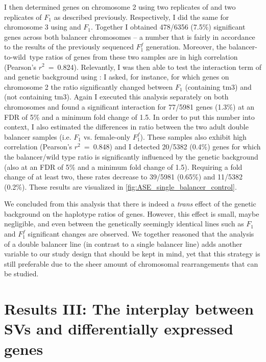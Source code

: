 I then determined \ase genes on chromosome 2 using two replicates of \Fcyo
and two replicates of $F_1$ as described previously. Respectively, I did
the same for chromosome 3 using \Ftm and $F_1$.
Together I obtained 478/6356 (7.5\%) significant \ase genes across both balancer
chromosomes – a number that is fairly in accordance to the results of the
previously sequenced $F_1^f$ generation. Moreover, the balancer-to-wild\ type
ratios of genes from these two samples are in high correlation (Pearson’s
$r^2$~=~0.824). Relevantly, I was then able to test the interaction term of \ase
and genetic background using \deseq: I asked, for instance, for which genes on
chromosome 2 the \ase ratio significantly changed between $F_1$ (containing
\ac{tm3}) and \Fcyo (not containing \ac{tm3}).
Again I executed this analysis separately on both chromosomes and found a
significant interaction for 77/5981 genes (1.3\%) at an FDR of 5\% and a
minimum fold change of 1.5. In order to put this number into context, I also
estimated the differences in \ase ratio between the two adult double balancer
samples (i.e. $F_1$ vs. female-only $F_1^f$). These samples also exhibit high
correlation (Pearson’s $r^2$~=~0.848) and I detected 20/5382 (0.4\%) genes
for which the balancer/wild type ratio is significantly influenced by the
genetic background (also at an FDR of 5\% and a minimum fold change of 1.5).
Requiring a fold change of at least two, these rates decrease to 39/5981
(0.65\%) and 11/5382 (0.2\%).
These results are visualized in \cref{fig:ASE_single_balancer_control}.

We concluded from this analysis that there is indeed a \textit{trans} effect of
the genetic background on the haplotype ratios of genes. However, this effect is
small, maybe negligible, and even between the genetically seemingly identical
lines such as $F_1$ and $F_1^f$ significant changes are observed.
We together reasoned that the analysis of a double balancer line (in contrast
to a single balancer line) adds another variable to our study design that should
be kept in mind, yet that this strategy
is still preferable due to the sheer amount of chromosomal rearrangements that
can be studied.







\section{Results III: The interplay between SVs and differentially expressed genes}
\label{sec:balancer_sv_interplay}

